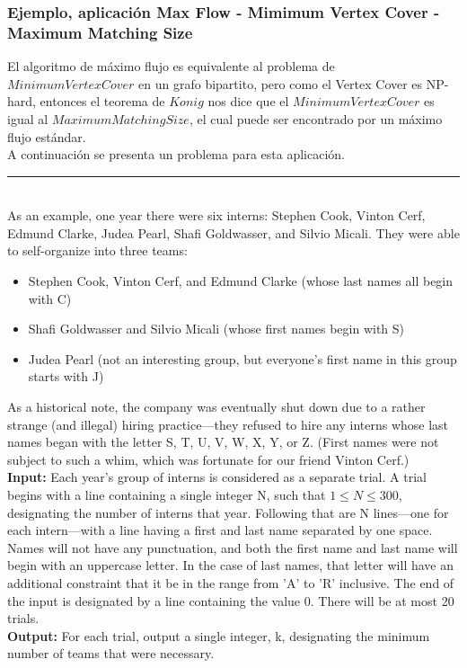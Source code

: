 \documentclass[10pt,letterpaper,twocolumn]{article}
\begin{document}
    \subsubsection{Ejemplo, aplicación Max Flow - Mimimum Vertex Cover - Maximum Matching Size}
    El algoritmo de máximo flujo es equivalente al problema de $Minimum Vertex Cover$ en un grafo bipartito, pero como el Vertex Cover es NP-hard, entonces el teorema de $Konig$ nos dice que el $Minimum Vertex Cover$ es igual al $Maximum Matching Size$, el cual puede ser encontrado por un máximo flujo estándar.\\
    A continuación se presenta un problema para esta aplicación.\\
\rule{12cm}{.1pt}\\
    As an example, one year there were six interns: Stephen Cook, Vinton Cerf, Edmund Clarke, Judea Pearl, Shafi Goldwasser, and Silvio Micali. They were able to self-organize into three teams:
    \begin{itemize}
      \item Stephen Cook, Vinton Cerf, and Edmund Clarke (whose last names all begin with C)
      \item Shafi Goldwasser and Silvio Micali (whose first names begin with S)
      \item Judea Pearl (not an interesting group, but everyone's first name in this group starts with J)
    \end{itemize}
As a historical note, the company was eventually shut down due to a rather strange (and illegal) hiring practice---they refused to hire any interns whose last names began with the letter S, T, U, V, W, X, Y, or Z. (First names were not subject to such a whim, which was fortunate for our friend Vinton Cerf.)\\
\textbf{Input:}  Each year's group of interns is considered as a separate trial. A trial begins with a line containing a single integer N, such that $1 \leq N \leq 300$, designating the number of interns that year. Following that are N lines---one for each intern---with a line having a first and last name separated by one space. Names will not have any punctuation, and both the first name and last name will begin with an uppercase letter. In the case of last names, that letter will have an additional constraint that it be in the range from 'A' to 'R' inclusive. The end of the input is designated by a line containing the value 0. There will be at most 20 trials.\\
\textbf{Output:}  For each trial, output a single integer, k, designating the minimum number of teams that were necessary.\\
\end{document}

